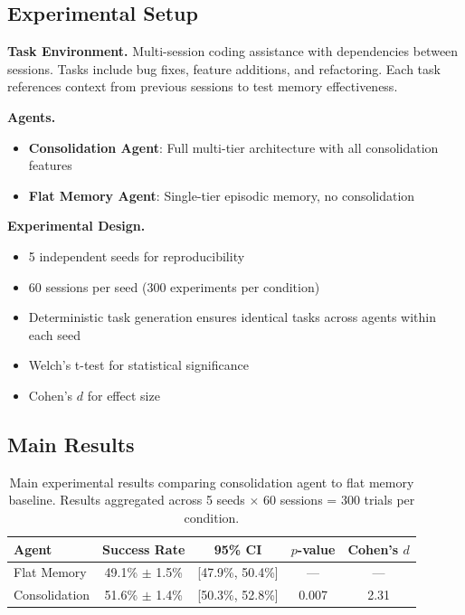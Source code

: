 \documentclass[11pt]{article}
\begin{document}
\subsection{Experimental Setup}

\textbf{Task Environment.} Multi-session coding assistance with dependencies between sessions. Tasks include bug fixes, feature additions, and refactoring. Each task references context from previous sessions to test memory effectiveness.

\textbf{Agents.}
\begin{itemize}
    \item \textbf{Consolidation Agent}: Full multi-tier architecture with all consolidation features
    \item \textbf{Flat Memory Agent}: Single-tier episodic memory, no consolidation
\end{itemize}

\textbf{Experimental Design.}
\begin{itemize}
    \item 5 independent seeds for reproducibility
    \item 60 sessions per seed (300 experiments per condition)
    \item Deterministic task generation ensures identical tasks across agents within each seed
    \item Welch's t-test for statistical significance
    \item Cohen's $d$ for effect size
\end{itemize}

\subsection{Main Results}

\begin{table}[t]
\centering
\caption{Main experimental results comparing consolidation agent to flat memory baseline. Results aggregated across 5 seeds $\times$ 60 sessions = 300 trials per condition.}
\label{tab:main_results}
\begin{tabular}{@{}lcccc@{}}
\toprule
Agent & Success Rate & 95\% CI & $p$-value & Cohen's $d$ \\
\midrule
Flat Memory & 49.1\% $\pm$ 1.5\% & [47.9\%, 50.4\%] & --- & --- \\
Consolidation & 51.6\% $\pm$ 1.4\% & [50.3\%, 52.8\%] & 0.007 & 2.31 \\
\bottomrule
\end{tabular}
\end{table}
\end{document}
